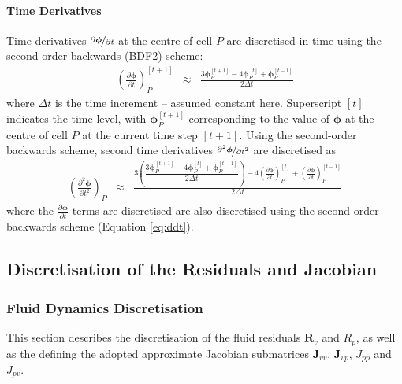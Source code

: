 \documentclass[sn-mathphys,Numbered]{sn-jnl}%
\newcommand{\bb}{\boldsymbol}
\begin{document}
\paragraph{Time Derivatives}
Time derivatives $\nicefrac{\partial \bb{\phi}}{\partial t}$ at the centre of cell $P$ are discretised in time using the second-order backwards (BDF2) scheme:
\begin{eqnarray} \label{eq:ddt}
	\left(\frac{\partial \bb{\phi}}{\partial t}\right)_P^{[t+1]}
		&\approx& \frac{3 \bb{\phi}_P^{[t+1]} - 4 \bb{\phi}_P^{[t]} + \bb{\phi}_P^{[t-1]}}{2\Delta t} 
\end{eqnarray}
where $\Delta t$ is the time increment -- assumed constant here.
Superscript $[t]$ indicates the time level, with $\bb{\phi}_P^{[t+1]}$ corresponding to the value of $\bb{\phi}$ at the centre of cell $P$ at the current time step $[t+1]$.
Using the second-order backwards scheme, second time derivatives $\nicefrac{\partial^2 \bb{\phi}}{\partial t^2}$ are discretised as
\begin{eqnarray}
	\left(\frac{\partial^2 \bb{\phi}}{\partial t^2}\right)_P
	&\approx&
	\frac{3\left( 
		\dfrac{3\bb{\phi}_P^{[t+1]} - 4\bb{\phi}_P^{[t]} + \bb{\phi}_P^{[t-1]}}{2\Delta t} 
		\right) 
	- 4\left(\frac{\partial \bb{\phi}}{\partial t}\right)_P^{[t]} + \left(\frac{\partial \bb{\phi}}{\partial t}\right)_P^{[t-1]}}{2\Delta t}
\end{eqnarray}
where the $\frac{\partial \bb{\phi}}{\partial t}$ terms are discretised are also discretised using the second-order backwards scheme (Equation \ref{eq:ddt}).



\subsection{Discretisation of the Residuals and Jacobian}


\subsubsection[Fluid Dynamics Residuals Discretisation]{Fluid Dynamics Discretisation}
This section describes the discretisation of the fluid residuals $\bb{R}_v$ and $R_p$, as well as the defining the adopted approximate Jacobian submatrices $\bb{J}_{vv}$, $\bb{J}_{vp}$, $J_{pp}$ and $J_{pv}$.
\end{document}
